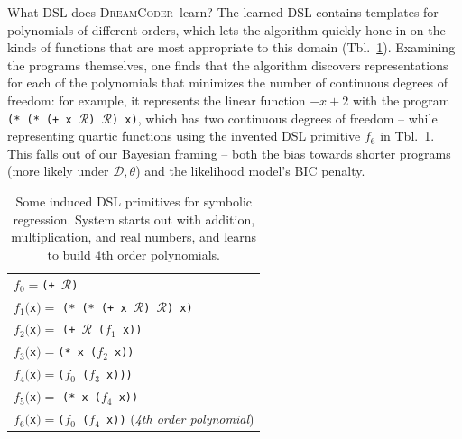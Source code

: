 \documentclass{article}
\newcommand{\system}{\textsc{DreamCoder}~}
\newcommand{\code}[1]{{\footnotesize\texttt{#1}}}
\newcommand{\probability}{\mathds{P}} %
\begin{document}
What DSL does \system learn?
The learned DSL contains templates for polynomials of different orders,
which lets the algorithm quickly hone in on the kinds of functions that are most appropriate to this domain (Tbl.~\ref{regressionDSL}).
Examining the programs themselves,
one finds that the algorithm discovers representations for each of the polynomials that minimizes the number of continuous degrees of freedom:
for example, it represents the linear function $-x+2$ with the program 
\code{(* (* (+ x }$\mathcal{R}$\code{) }$\mathcal{R}$\code{) x)}, which has two continuous degrees of freedom -- while representing quartic functions using the invented DSL primitive $f_6$ in Tbl.~\ref{regressionDSL}.
This falls out of our Bayesian framing -- both the bias towards shorter programs (more likely under $\mathcal{D},\theta$) and the likelihood model's BIC penalty.
\begin{table}\centering
\begin{tabular}{l}
  \toprule
    $f_0 = $\code{(+ }$\mathcal{R}$\code{)}\\
    $f_1($\code{x}$) =$ \code{(* (* (+ x }$\mathcal{R}$\code{) }$\mathcal{R}$\code{) x)} \\
      $f_2($\code{x}$) =$ \code{(+ }$\mathcal{R}$\code{ ($f_1$ x))} \\
      $f_3($\code{x}$) = $\code{(* x (}$f_2$\code{ x))}\\
  $f_4($\code{x}$) = $\code{(}$f_0$\code{ (}$f_3$\code{ x)))}\\
  $f_5($\code{x}$) =$ \code{(* x (}$f_4$\code{ x))}\\
  $f_6($\code{x}$) = $\code{(}$f_0$\code{ (}$f_4$\code{ x))} (\emph{4th order polynomial})
  \\\bottomrule
\end{tabular}
\caption{Some induced DSL primitives for symbolic regression. System starts out with addition, multiplication, and real numbers, and learns to build 4th order polynomials.}\label{regressionDSL}
\end{table}
\end{document}
